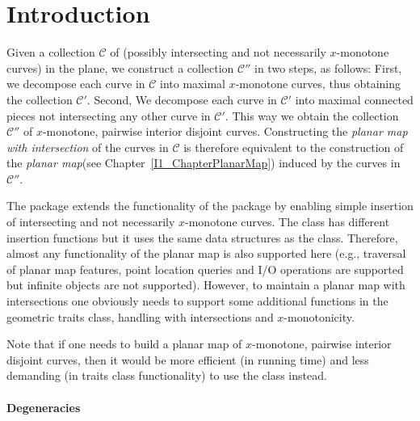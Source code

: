 

\section{Introduction}

Given a collection ${\mathcal C}$ of (possibly intersecting and not necessarily
$x$-monotone curves) in the plane, we construct a collection ${\mathcal C}''$ in
two steps, as follows: First, we decompose each curve in ${\mathcal C}$ into
maximal $x$-monotone curves, thus obtaining the collection
${\mathcal C}'$. Second, We decompose each curve in ${\mathcal C}'$ into 
maximal connected pieces not intersecting any other curve in ${\mathcal C}'$.
This way we obtain the collection ${\mathcal C}''$ of $x$-monotone, pairwise 
interior disjoint curves.  Constructing the {\it planar map with 
intersection} of the curves in ${\mathcal C}$ is therefore equivalent to the
construction of the {\it planar map}(see Chapter~\ref{I1_ChapterPlanarMap}) 
induced by the curves in ${\mathcal C}''$.

The  package extends the functionality 
of the  package by enabling simple insertion of intersecting 
and not necessarily $x$-monotone curves. The 
 class has different insertion functions 
but it uses the same data structures as the  class. 
Therefore, almost any functionality of the planar map is also supported here 
(e.g., traversal of planar map features, point location queries and I/O 
operations are supported but infinite objects are not supported). However, 
to maintain a planar map with intersections one obviously needs to support 
some additional functions in the geometric traits class, handling with 
intersections and $x$-monotonicity.

Note that if one needs to build a planar map of $x$-monotone, pairwise 
interior disjoint curves, then it would be more efficient (in running time) 
and less demanding (in traits class functionality) to use the 
 class instead.

\paragraph{Degeneracies} 
  
